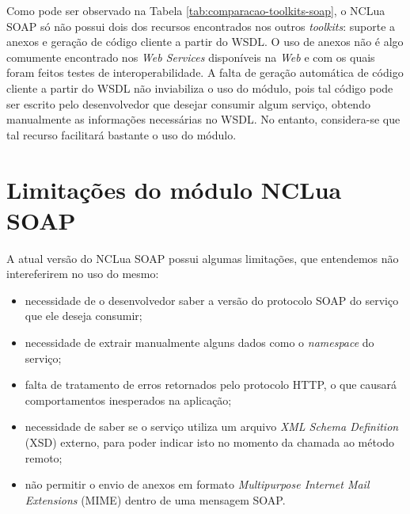 Como pode ser observado na Tabela \ref{tab:comparacao-toolkits-soap}, o NCLua SOAP só não possui dois dos 
recursos encontrados nos outros \textit{toolkits}: suporte a anexos e geração de código cliente a partir do WSDL.
O uso de anexos não é algo comumente encontrado nos \textit{Web Services} disponíveis na \textit{Web} e com
os quais foram feitos testes de interoperabilidade. A falta de geração automática de código cliente a partir do WSDL
não inviabiliza o uso do módulo, pois tal código pode ser escrito pelo desenvolvedor que desejar consumir algum
serviço, obtendo manualmente as informações necessárias no WSDL. No entanto, considera-se que tal recurso facilitará bastante o uso do módulo.


\section{Limitações do módulo NCLua SOAP}

A atual versão do NCLua SOAP possui algumas limitações, que entendemos não intereferirem no uso do mesmo:

\begin{itemize}
	\item necessidade de o desenvolvedor saber a versão do protocolo SOAP do serviço que ele deseja consumir;
  \item necessidade de extrair manualmente alguns dados como o \textit{namespace} do serviço;
  \item falta de tratamento de erros retornados pelo protocolo HTTP, o que causará comportamentos
  inesperados na aplicação;
  \item necessidade de saber se o serviço utiliza um arquivo \textit{XML Schema Definition} (XSD) externo,
        para poder indicar isto no momento da chamada ao método remoto;
  \item não permitir o envio de anexos em formato \textit{Multipurpose Internet Mail Extensions} (MIME)\cite{rfc2045} 
  dentro de uma mensagem SOAP.
\end{itemize}


